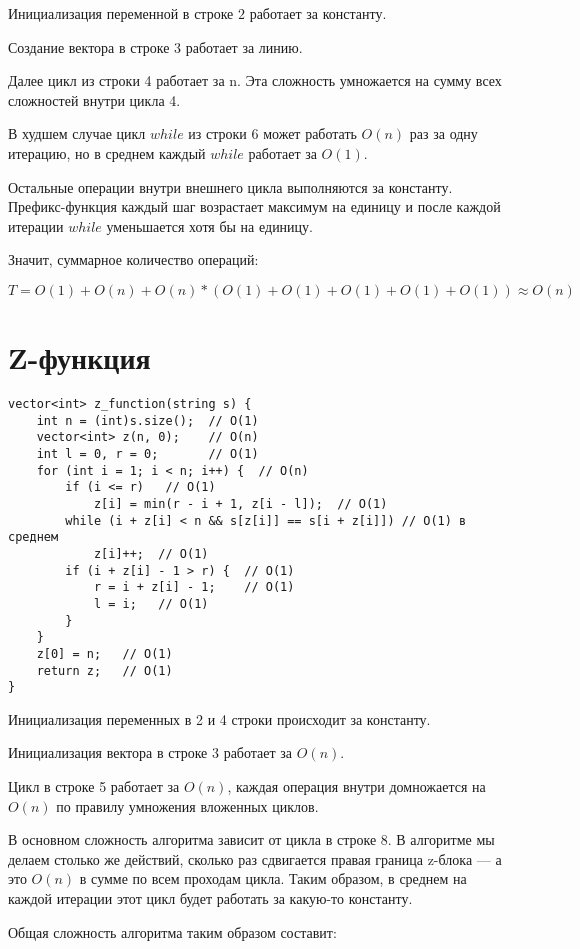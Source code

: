 \documentclass[otchet]{SCWorks}
\begin{document}
Инициализация переменной в строке $2$ работает за константу.

Создание вектора в строке $3$ работает за линию.

Далее цикл из строки 4 работает за n. Эта сложность умножается на сумму всех сложностей внутри цикла 4.

В худшем случае цикл $while$ из строки $6$ может работать $O(n)$ раз за одну итерацию, но в среднем каждый $while$ работает за $O(1)$.

Остальные операции внутри внешнего цикла выполняются за константу.
Префикс-функция каждый шаг возрастает максимум на единицу и после каждой итерации $while$ уменьшается хотя бы на единицу. 

Значит, суммарное количество операций:

$T = O(1) + O(n) + O(n) * (O(1) + O(1) + O(1) + O(1) + O(1)) \approx O(n)$

\section{Z-функция}

\begin{verbatim}
vector<int> z_function(string s) {
    int n = (int)s.size();  // O(1)
    vector<int> z(n, 0);    // O(n)
    int l = 0, r = 0;       // O(1)
    for (int i = 1; i < n; i++) {  // O(n)
        if (i <= r)   // O(1)
            z[i] = min(r - i + 1, z[i - l]);  // O(1)
        while (i + z[i] < n && s[z[i]] == s[i + z[i]]) // O(1) в среднем
            z[i]++;  // О(1)
        if (i + z[i] - 1 > r) {  // О(1)
            r = i + z[i] - 1;    // О(1)
            l = i;   // О(1)
        }
    }
    z[0] = n;   // О(1)
    return z;   // О(1)
}
\end{verbatim}

Инициализация переменных в 2 и 4 строки происходит за константу.

Инициализация вектора в строке 3 работает за $O(n)$.

Цикл в строке 5 работает за $O(n)$, каждая операция внутри домножается на $O(n)$ по правилу умножения вложенных циклов.

В основном сложность алгоритма зависит от цикла в строке 8. В алгоритме мы делаем столько же действий, сколько раз сдвигается правая граница z-блока — а это $O(n)$ в сумме по всем проходам цикла. Таким образом, в среднем на каждой итерации этот цикл будет работать за какую-то константу.

Общая сложность алгоритма таким образом составит:
\end{document}
